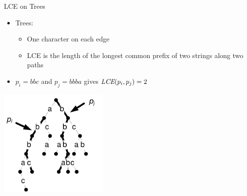 \documentclass{beamer}
\begin{document}
\begin{frame}{LCE on Trees}
    \begin{itemize}
        \item Trees:
        \begin{itemize}
            \item One character on each edge
            \item LCE is the length of the longest common prefix of two strings along two paths
        \end{itemize}
        \item $p_i=bbc$ and $p_j=bbba$ gives $\textit{LCE}(p_i,p_j)=2$
    \end{itemize}
    \begin{center}
        \includegraphics[width=0.4\textwidth,page=1]{tree-lce.pdf}
    \end{center}
\end{frame}
\end{document}
